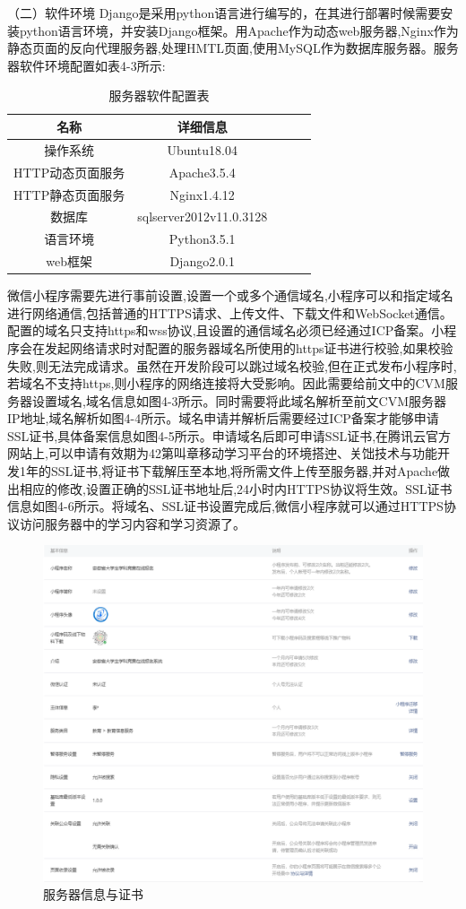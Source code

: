 \documentclass[a4paper]{ltxdoc}
\begin{document}
{		
		（二）软件环境
		Django是采用python语言进行编写的，在其进行部署时候需要安装python语言环境，并安装Django框架。用Apache作为动态web服务器,Nginx作为静态页面的反向代理服务器,处理HMTL页面,使用MySQL作为数据库服务器。服务器软件环境配置如表4-3所示:
		
		\begin{center}
			\begin{table}[!htb]
				\centering
				\caption{服务器软件配置表}
				\begin{tabular}{ccccc}
					\hline
					名称                     				&详细信息\\ \hline
					\multirow{1}{*}{操作系统} 			    &Ubuntu18.04\\ \hline
					\multirow{1}{*}{HTTP动态页面服务}     	&Apache3.5.4\\ \hline
					\multirow{1}{*}{HTTP静态页面服务}			&Nginx1.4.12\\ \hline
					\multirow{1}{*}{数据库}    				&sqlserver2012v11.0.3128\\ \hline
					\multirow{1}{*}{语言环境}  				&Python3.5.1\\ \hline
					\multirow{1}{*}{web框架}    			    &Django2.0.1\\ \hline
				\end{tabular}
			\end{table}
		\end{center}
		
		
		微信小程序需要先进行事前设置,设置一个或多个通信域名,小程序可以和指定域名进行网络通信,包括普通的HTTPS请求、上传文件、下载文件和WebSocket通信。配置的域名只支持https和wss协议,且设置的通信域名必须已经通过ICP备案。小程序会在发起网络请求时对配置的服务器域名所使用的https证书进行校验,如果校验失败,则无法完成请求。虽然在开发阶段可以跳过域名校验,但在正式发布小程序时,若域名不支持https,则小程序的网络连接将大受影响。因此需要给前文中的CVM服务器设置域名,域名信息如图4-3所示。同时需要将此域名解析至前文CVM服务器IP地址,域名解析如图4-4所示。域名申请并解析后需要经过ICP备案才能够申请SSL证书,具体备案信息如图4-5所示。申请域名后即可申请SSL证书,在腾讯云官方网站上,可以申请有效期为42第叫章移动学习平台的环境搭迚、关饳技术与功能开发1年的SSL证书,将证书下载解压至本地,将所需文件上传至服务器,并对Apache做出相应的修改,设置正确的SSL证书地址后,24小时内HTTPS协议将生效。SSL证书信息如图4-6所示。将域名、SSL证书设置完成后,微信小程序就可以通过HTTPS协议访问服务器中的学习内容和学习资源了。
		
		\begin{figure}[!htb]
			\centering
			\includegraphics[width=0.5\linewidth]{images/2.jpg}
			\caption{服务器信息与证书}
		\end{figure}
		
}
\end{document}
